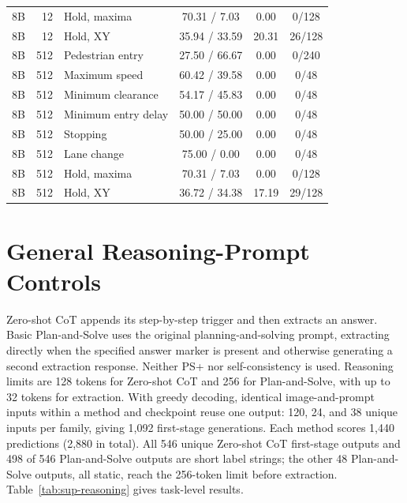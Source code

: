 \documentclass[10pt]{article}
\begin{document}
\begin{table}[h]
\begin{tabular}{lrlccc}
8B & 12 & Hold, maxima & 70.31 / 7.03 & 0.00 & 0/128\\
8B & 12 & Hold, XY & 35.94 / 33.59 & 20.31 & 26/128\\
8B & 512 & Pedestrian entry & 27.50 / 66.67 & 0.00 & 0/240\\
8B & 512 & Maximum speed & 60.42 / 39.58 & 0.00 & 0/48\\
8B & 512 & Minimum clearance & 54.17 / 45.83 & 0.00 & 0/48\\
8B & 512 & Minimum entry delay & 50.00 / 50.00 & 0.00 & 0/48\\
8B & 512 & Stopping & 50.00 / 25.00 & 0.00 & 0/48\\
8B & 512 & Lane change & 75.00 / 0.00 & 0.00 & 0/48\\
8B & 512 & Hold, maxima & 70.31 / 7.03 & 0.00 & 0/128\\
8B & 512 & Hold, XY & 36.72 / 34.38 & 17.19 & 29/128\\
\bottomrule
\end{tabular}
\end{table}

\section{General Reasoning-Prompt Controls}\label{sup:reasoning}

Zero-shot CoT appends its step-by-step trigger and then extracts an answer.
Basic Plan-and-Solve uses the original planning-and-solving prompt, extracting
directly when the specified answer marker is present and otherwise generating a
second extraction response. Neither PS+ nor self-consistency is used. Reasoning
limits are 128 tokens for Zero-shot CoT and 256 for Plan-and-Solve, with up to
32 tokens for extraction. With greedy decoding, identical image-and-prompt
inputs within a method and checkpoint reuse one output: 120, 24, and 38 unique
inputs per family, giving 1,092 first-stage generations. Each method scores
1,440 predictions (2,880 in total). All 546 unique Zero-shot CoT first-stage
outputs and 498 of 546 Plan-and-Solve outputs are short label strings; the
other 48 Plan-and-Solve outputs, all static, reach the 256-token limit before
extraction. Table~\ref{tab:sup-reasoning} gives task-level results.
\end{document}
